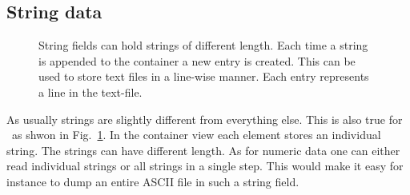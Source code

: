 \subsection{String data}
\begin{figure}[tb]
\centering
\begin{minipage}[c]{0.4\linewidth}
\centering
{}
\end{minipage}
\hfill
\begin{minipage}[c]{0.58\linewidth}
\caption{{\small\label{fig:container_string} String fields can hold strings 
of different length. Each time a string is appended to the container 
a new entry is created. This can be used to store text files in a line-wise
manner. Each entry represents a line in the text-file.}}
\end{minipage}
\end{figure}
As usually strings are slightly different from everything else. 
This is also true for \pninx\ as shwon in Fig.~\ref{fig:container_string}.
In the container view each element stores an individual string. The strings 
can have different length. 
As for numeric data one can either read individual strings or all strings 
in a single step. This would make it easy for instance to dump an entire 
ASCII file in such a string field. 

